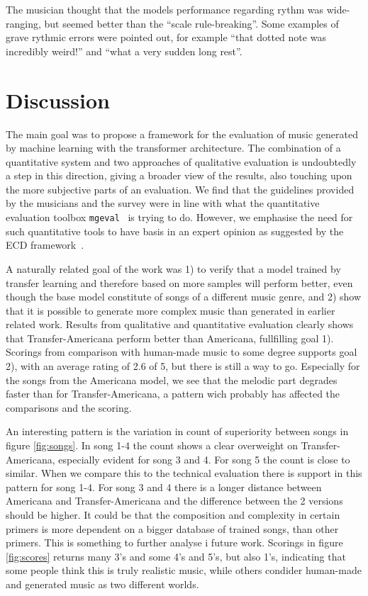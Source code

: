 \documentclass{IEEEtran}
\begin{document}
The musician thought that the models performance regarding rythm 
was wide-ranging, but seemed better than the ``scale rule-breaking''.
Some examples of grave rythmic errors were pointed out, for example
``that dotted note was incredibly weird!'' and  ``what a very sudden 
long rest''.

\section{Discussion}
The main goal was to propose a framework for the evaluation of music generated
by machine learning with the transformer architecture.
The combination of a quantitative system and two approaches of qualitative
evaluation is undoubtedly a step in this direction, giving a broader view of 
the results, also touching upon the more
subjective parts of an evaluation. We find that the guidelines provided by 
the musicians and the survey were in line with what the quantitative evaluation 
toolbox \lstinline|mgeval|~\cite{yang2020evaluation} is trying to 
do. However, we emphasise the need for such quantitative tools to have basis
in an expert opinion as suggested by the ECD
framework~\cite{mislevy2003focus,mislevy2017evidence}.

A naturally related goal of the work was 1) to verify that a model trained by transfer
learning and therefore based on more samples will perform better, even though
the base model constitute of songs of a different music genre, and 2) show
that it is possible to generate more complex music than generated in earlier
related work. Results from qualitative and quantitative evaluation clearly
shows that Transfer-Americana perform better than Americana, fullfilling goal
1). Scorings from comparison with human-made music to some degree supports
goal 2), with an average rating of 2.6 of 5, but there is still a way to go.
Especially for the songs from the Americana model, we see that the melodic
part degrades faster than for Transfer-Americana, a pattern wich probably has
affected the comparisons and the scoring.

An interesting pattern is the variation in count of superiority between songs
in figure \ref{fig:songs}. In song 1-4 the count shows a clear overweight on
Transfer-Americana, especially evident for song 3 and 4. For song 5 the count
is close to similar. When we compare this to the technical evaluation there is 
support in this pattern for song 1-4. For song 3 and 4 there is a longer distance 
between Americana and Transfer-Americana and the difference between the 2 versions 
should be higher. It could be that the composition and complexity in
certain primers is more dependent on a bigger database of trained songs, than
other primers. This is something to further analyse i future work. Scorings
in figure \ref{fig:scores} returns many 3's and some 4's and 5's, but also
1's, indicating that some people think this is truly realistic music, while
others condider human-made and generated music as two different worlds.
\end{document}
